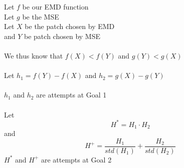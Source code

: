 \documentclass[12pt,psfig]{article}
\begin{document}
\setlength{\parskip}{1.2ex plus0.3ex minus 0.3ex}


\thispagestyle{empty} \pagestyle{myheadings} 

Let $f$ be our EMD function\\
Let $g$ be the MSE\\
Let $X$ be the patch chosen by EMD \\
and $Y$ be patch chosen by MSE\\
\\
We thus know that $f(X)<f(Y)$ and $g(Y)<g(X)$\\
\\
Let $h_1=f(Y)-f(X)$ and $h_2=g(X)-g(Y)$\\
\\
$h_1$ and $h_2$ are attempts at Goal 1\\
\\
Let 
\[
H^*=H_1 \cdot H_2
\]
and 
\[
H^+ = \frac{H_1}{std(H_1)} + \frac{H_2}{std(H_2)}
\]
$H^*$ and $H^+$ are attempts at Goal 2
\end{document}
